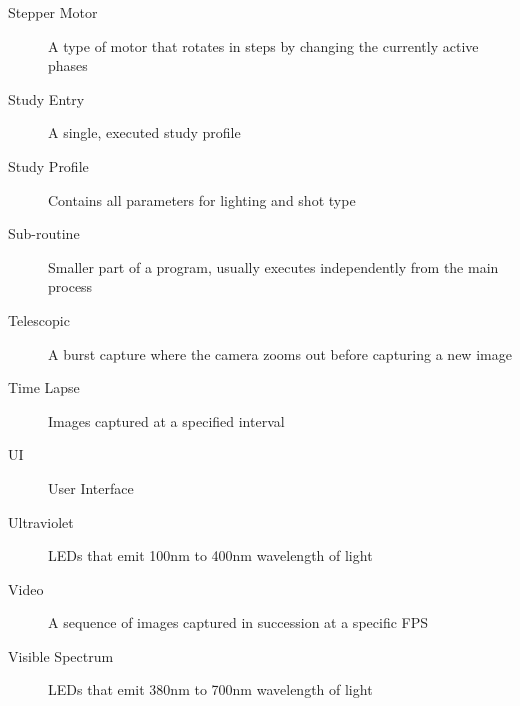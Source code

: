 \begin{description}
        \item[Stepper Motor] A type of motor that rotates in steps by changing the currently active phases
        \item[Study Entry] A single, executed study profile
        \item[Study Profile] Contains all parameters for lighting and shot type
	\item[Sub-routine] Smaller part of a program, usually executes independently from the main process
        \item[Telescopic] A burst capture where the camera zooms out before capturing a new image
        \item[Time Lapse] Images captured at a specified interval
	\item[UI] User Interface
        \item[Ultraviolet] LEDs that emit 100nm to 400nm wavelength of light
        \item[Video] A sequence of images captured in succession at a specific FPS
        \item[Visible Spectrum] LEDs that emit 380nm to 700nm wavelength of light
\end{description}